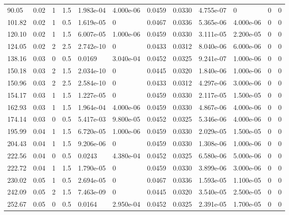 \documentclass[preview]{standalone}
\begin{document}
{{\begin{tabular}{L{1.2cm}C{1.2cm} C{0.3cm}C{0.5cm} C{1.4cm}C{1.4cm} C{1.4cm}C{1.4cm} C{1.6cm}C{1.6cm} C{1.6cm}C{1.6cm}}
  90.05  &  0.02  & 1     & 1.5 &  1.983e-04  & 4.000e-06  &  0.0459&   0.0330& 4.755e-07 & 0   &  0 & 0  \\ 
  101.82  &  0.02  & 1     & 0.5 &  1.619e-05  & 0  &  0.0467&   0.0336& 5.365e-06 & 4.000e-06   &  0 & 0  \\ 
  120.10  &  0.02  & 1     & 1.5 &  6.007e-05  & 1.000e-06  &  0.0459&   0.0330& 3.111e-05 & 2.200e-05   &  0 & 0  \\ 
  124.05  &  0.02  & 2     & 2.5 &  2.742e-10  & 0  &  0.0433&   0.0312& 8.040e-06 & 6.000e-06   &  0 & 0  \\ 
  138.16  &  0.03  & 0     & 0.5 &  0.0169  & 3.040e-04  &  0.0452&   0.0325& 9.241e-07 & 1.000e-06   &  0 & 0  \\ 
  150.18  &  0.03  & 2     & 1.5 &  2.034e-10  & 0  &  0.0445&   0.0320& 1.840e-06 & 1.000e-06   &  0 & 0  \\ 
  150.96  &  0.03  & 2     & 2.5 &  2.584e-10  & 0  &  0.0433&   0.0312& 4.297e-06 & 3.000e-06   &  0 & 0  \\ 
  154.17  &  0.03  & 1     & 1.5 &  1.227e-05  & 0  &  0.0459&   0.0330& 2.117e-05 & 1.500e-05   &  0 & 0  \\ 
  162.93  &  0.03  & 1     & 1.5 &  1.964e-04  & 4.000e-06  &  0.0459&   0.0330& 4.867e-06 & 4.000e-06   &  0 & 0  \\ 
  174.14  &  0.03  & 0     & 0.5 &  5.417e-03  & 9.800e-05  &  0.0452&   0.0325& 5.346e-06 & 4.000e-06   &  0 & 0  \\ 
  195.99  &  0.04  & 1     & 1.5 &  6.720e-05  & 1.000e-06  &  0.0459&   0.0330& 2.029e-05 & 1.500e-05   &  0 & 0  \\ 
  204.43  &  0.04  & 1     & 1.5 &  9.206e-06  & 0  &  0.0459&   0.0330& 1.308e-06 & 1.000e-06   &  0 & 0  \\ 
  222.56  &  0.04  & 0     & 0.5 &  0.0243  & 4.380e-04  &  0.0452&   0.0325& 6.580e-06 & 5.000e-06   &  0 & 0  \\ 
  222.72  &  0.04  & 1     & 1.5 &  1.790e-05  & 0  &  0.0459&   0.0330& 3.899e-06 & 3.000e-06   &  0 & 0  \\ 
  230.02  &  0.05  & 1     & 0.5 &  2.694e-05  & 0  &  0.0467&   0.0336& 1.593e-05 & 1.100e-05   &  0 & 0  \\ 
  242.09  &  0.05  & 2     & 1.5 &  7.463e-09  & 0  &  0.0445&   0.0320& 3.540e-05 & 2.500e-05   &  0 & 0  \\ 
  252.67  &  0.05  & 0     & 0.5 &  0.0164  & 2.950e-04  &  0.0452&   0.0325& 2.391e-05 & 1.700e-05   &  0 & 0  \\ 

\end{tabular}}}
\end{document}
